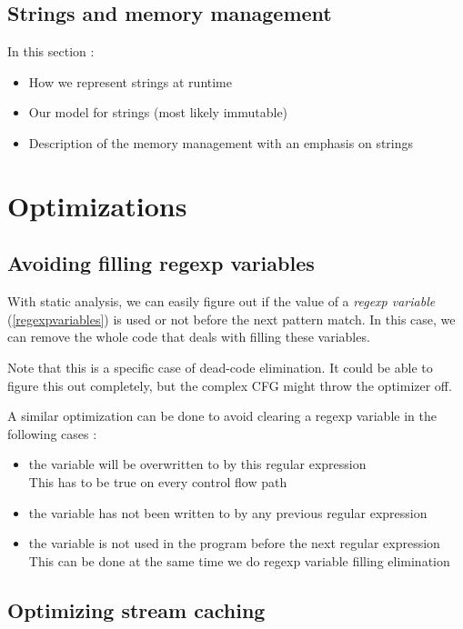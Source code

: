 \documentclass[11pt,a4paper]{report}
\begin{document}
\section{Strings and memory management}
\label{stringrep}

In this section :
\begin{itemize}
\item How we represent strings at runtime
\item Our model for strings (most likely immutable)
\item Description of the memory management with an emphasis on strings
\end{itemize}

\chapter{Optimizations}

\section{Avoiding filling regexp variables}
\label{regexpvariablesoptimization}

With static analysis, we can easily figure out if the value of a \textit{regexp variable} (\ref{regexpvariables}) is used or not before the next pattern match. In this case, we can remove the whole code that deals with filling these variables.

Note that this is a specific case of dead-code elimination. It could be able to figure this out completely, but the complex CFG might throw the optimizer off.

A similar optimization can be done to avoid clearing a regexp variable in the following cases :
\begin{itemize}
\item the variable will be overwritten to by this regular expression\\
This has to be true on every control flow path
\item the variable has not been written to by any previous regular expression
\item the variable is not used in the program before the next regular expression\\
This can be done at the same time we do regexp variable filling elimination
\end{itemize}

\section{Optimizing stream caching}
\label{streamcachingopt}
\end{document}
